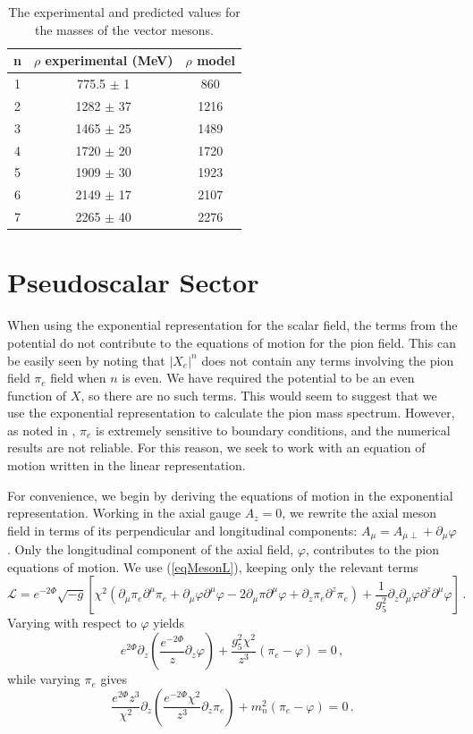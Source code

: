 \documentclass[aps,prd,12pt,nofootinbib]{revtex4}
\newcommand{\be}{\begin{equation}}
\newcommand{\ee}{\end{equation}}
\newcommand{\cL}{\mathcal L}
\begin{document}
\begin{table}[htb]
\center
\begin{tabular}{| c || c | c  |}
\hline
n & $\rho$ experimental (MeV) & $\rho$ model \\
\hline
1 & 775.5 $\pm$  1 & 860	\\
2 & 1282 $\pm$ 37 & 1216 \\
3 & 1465 $\pm$ 25 & 1489 \\
4 &  1720 $\pm$ 20 & 1720 \\ 
5 &  1909 $\pm$ 30 & 1923 \\
6 &  2149 $\pm$  17& 2107 \\
7 &  2265 $\pm$  40& 2276 \\ 
\hline
\end{tabular}
\caption{The experimental \cite{PDG} and predicted values for the masses of the vector mesons.}
\label{tabRho}
\end{table}

\section{Pseudoscalar Sector}

When using the exponential representation for the scalar field, the terms from the potential do not contribute to the equations of motion for the pion field.
This can be easily seen by noting that $|X_e|^n$ does not contain any terms involving the pion field $\pi_e$ field when $n$ is even. 
We have required the potential to be an even function of $X$, so there are no such terms.
This would seem to suggest that we use the exponential representation to calculate the pion mass spectrum.
However, as noted in \cite{bartz-pions}, $\pi_e$ is extremely sensitive to boundary conditions, and the numerical results are not reliable.
For this reason, we seek to work with an equation of motion written in the linear representation.

For convenience, we begin by deriving the equations of motion in the exponential representation.
Working in the axial gauge $A_z = 0$, we rewrite the axial meson field in terms of its perpendicular and longitudinal components: $A_\mu = A_{\mu\perp} +\partial_\mu \varphi$.
Only the longitudinal component of the axial field, $\varphi$, contributes to the pion equations of motion.
We use (\ref{eqMesonL}), keeping only the relevant terms
\be
\cL = e^{-2\Phi} \sqrt{-g} \left[ \chi^2 (\partial_\mu \pi_e \partial^\mu \pi_e +  \partial_\mu \varphi \partial^\mu \varphi - 2 \partial_\mu \pi \partial^\mu \varphi +  \partial_z \pi_e \partial^z \pi_e)  + \frac{1}{g_5^2}\partial_z \partial_\mu \varphi \partial^z\partial^\mu \varphi \right] \, .
\ee
Varying with respect to $\varphi$ yields
\be
e^{2\Phi} \partial_z \left(\frac{e^{-2\Phi}}{z}\partial_z \varphi \right) + \frac{g_5^2 \chi^2}{z^3}(\pi_e-\varphi)=0 \, ,
\ee
while varying $\pi_e$ gives
\be
\frac{e^{2\Phi} z^3}{\chi^2}\partial_z \left(\frac{e^{-2\Phi}\chi^2}{z^3} \partial_z \pi_e \right) +m_n^2(\pi_e-\varphi) = 0 \, .
\ee
\end{document}
